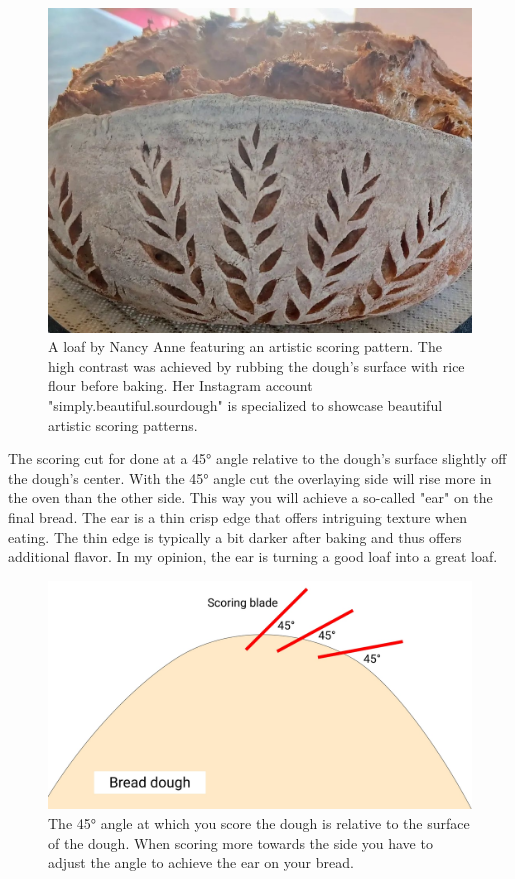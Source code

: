 \begin{figure}[htb!]
  \includegraphics[width=\textwidth]{artistic-scoring}
  \caption{A loaf by Nancy Anne featuring an artistic scoring pattern.
  The high contrast was achieved by rubbing the 
  dough's surface with rice flour before baking. Her Instagram
  account "simply.beautiful.sourdough" is specialized to showcase
  beautiful artistic scoring patterns.}
  \label{fig:artistic-scoring}
\end{figure}

The scoring cut for done at a 45° angle relative to the dough's
surface slightly off the dough's center. With the 45° angle cut
the overlaying side will rise more in the oven than the other side.
This way you will achieve a so-called "ear" on the final bread.
The ear is a thin crisp edge that offers intriguing texture
when eating. The thin edge is typically a bit darker after baking
and thus offers additional flavor. In my opinion, the ear is turning
a good loaf into a great loaf.

\begin{figure}[htb!]
  \includegraphics[width=\textwidth]{bread-scoring-angle}
  \caption{The 45° angle at which you score the dough is relative to the surface of the dough.
  When scoring more towards the side you have to adjust the angle to achieve the ear on your
  bread.}
  \label{fig:scoring-angle}
\end{figure}

